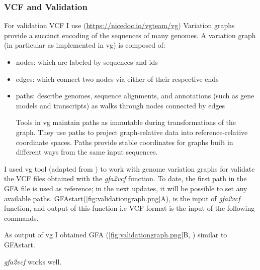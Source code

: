 
\subsubsection{VCF and Validation}

For validation VCF I use (\url{https://nicedoc.io/vgteam/vg}) Variation graphs provide a succinct encoding of the sequences of many genomes. 
A variation graph (in particular as implemented in vg) is composed of:
\begin{itemize}
\item nodes: which are labeled by sequences and ids
    
\item edges: which connect two nodes via either of their respective ends
   
\item paths: describe genomes, sequence alignments, and annotations (such as gene models and transcripts) as walks through nodes connected by edges

Tools in vg maintain paths as immutable during transformations of the graph. They use paths to project graph-relative data into reference-relative coordinate spaces. Paths provide stable coordinates for graphs built in different ways from the same input sequences.

\end{itemize}
I used vg tool (adapted from \cite{vg}) to work with genome variation graphs for validate the VCF files obtained with the \textit{gfa2vcf} function. To date, the first path in the GFA file is used as reference; in the next updates, it will be possible to set any available paths.
GFAstart(\ref{fig:validationgraph.png}A), is the input of \textit{gfa2vcf} function, and output of this function i.e VCF format is the input of the following commands.  

As output of vg I obtained GFA (\ref{fig:validationgraph.png}B, ) similar to GFAstart. 

\textit{gfa2vcf} works well. 



